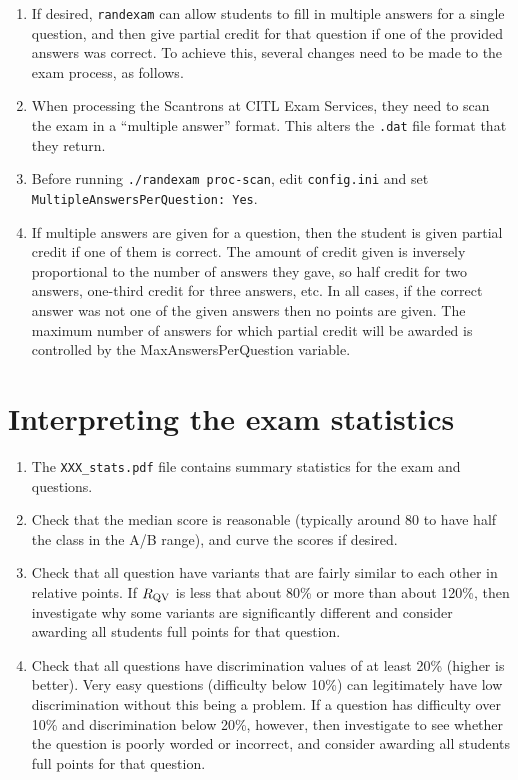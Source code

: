 \documentclass{article}
\begin{document}
\begin{enumerate}
\item If desired, \texttt{randexam} can allow students to fill in
  multiple answers for a single question, and then give partial credit
  for that question if one of the provided answers was correct. To
  achieve this, several changes need to be made to the exam process,
  as follows.
\item When processing the Scantrons at CITL Exam Services, they need
  to scan the exam in a ``multiple answer'' format. This alters the
  \texttt{.dat} file format that they return.
\item Before running \texttt{./randexam proc-scan}, edit
  \texttt{config.ini} and set \texttt{MultipleAnswersPerQuestion:
    Yes}.
\item If multiple answers are given for a question, then the student
  is given partial credit if one of them is correct. The amount of
  credit given is inversely proportional to the number of answers they
  gave, so half credit for two answers, one-third credit for three
  answers, etc. In all cases, if the correct answer was not one of the
  given answers then no points are given. The maximum number of
  answers for which partial credit will be awarded is controlled by
  the MaxAnswersPerQuestion variable.
\end{enumerate}

\section{Interpreting the exam statistics}

\begin{enumerate}
\item The \texttt{XXX_stats.pdf} file contains summary statistics for
  the exam and questions.
\item Check that the median score is reasonable (typically around 80
  to have half the class in the A/B range), and curve the scores if
  desired.
\item Check that all question have variants that are fairly similar to
  each other in relative points. If $R_{\rm QV}$ is less that about
  80\% or more than about 120\%, then investigate why some variants
  are significantly different and consider awarding all students full
  points for that question.
\item Check that all questions have discrimination values of at least
  20\% (higher is better). Very easy questions (difficulty below 10\%)
  can legitimately have low discrimination without this being a
  problem. If a question has difficulty over 10\% and discrimination
  below 20\%, however, then investigate to see whether the question is
  poorly worded or incorrect, and consider awarding all students full
  points for that question.
\end{enumerate}
\end{document}
